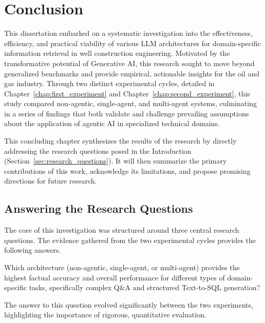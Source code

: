 \chapter{Conclusion}
\label{chap:conclusion}

This dissertation embarked on a systematic investigation into the effectiveness, efficiency, and practical viability of various LLM architectures for domain-specific information retrieval in well construction engineering. Motivated by the transformative potential of Generative AI, this research sought to move beyond generalized benchmarks and provide empirical, actionable insights for the oil and gas industry. Through two distinct experimental cycles, detailed in Chapter~\ref{chap:first_experiment} and Chapter~\ref{chap:second_experiment}, this study compared non-agentic, single-agent, and multi-agent systems, culminating in a series of findings that both validate and challenge prevailing assumptions about the application of agentic AI in specialized technical domains.

This concluding chapter synthesizes the results of the research by directly addressing the research questions posed in the Introduction (Section~\ref{sec:research_questions}). It will then summarize the primary contributions of this work, acknowledge its limitations, and propose promising directions for future research.

\section{Answering the Research Questions}
\label{sec:conclusion_rq}

    The core of this investigation was structured around three central research questions. The evidence gathered from the two experimental cycles provides the following answers.

    \vspace{\baselineskip}
    \begin{tcolorbox}[colback=gray!10, colframe=gray!40, title=\textbf{RQ1: Performance and Task-Dependency}]
    Which architecture (non-agentic, single-agent, or multi-agent) provides the highest factual accuracy and overall performance for different types of domain-specific tasks, specifically complex Q\&A and structured Text-to-SQL generation?
    \end{tcolorbox}
    \vspace{\baselineskip}

    The answer to this question evolved significantly between the two experiments, highlighting the importance of rigorous, quantitative evaluation.

